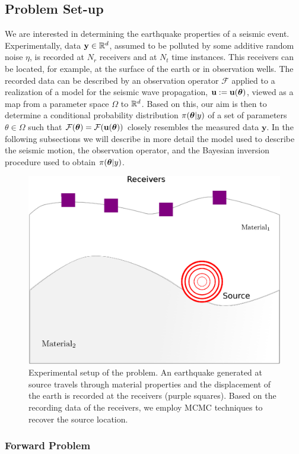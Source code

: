 \subsection{Problem Set-up}
We are interested in determining  the earthquake properties of a seismic event. Experimentally,  data  $\mathbf{y}\in \mathbb{R}^d$, assumed to be  polluted by some additive random noise $\eta$, is recorded at $N_r$ receivers and at $N_t$ time instances. This receivers can be located, for example, at the surface of the earth or in observation wells.  The recorded data can be described by an observation operator $\mathcal{F}$  applied to a realization of a model for the seismic wave propagation, $\mathbf{u}:=\mathbf{u}(\bm{\theta})$, viewed as a map from a parameter space $\Omega$ to $\mathbb{R}^d$. Based on this, our aim is then to  determine a conditional probability distribution $\pi(\bm{\theta}|y)$  of a set of parameters $\theta\in \Omega$ such that  $\mathcal{F}(\bm{\theta})=\mathcal{F}(\mathbf{u}(\bm{\theta}))$ closely resembles the measured data $\bm{y}$.  In the following subsections we will describe in more detail the model used to describe the seismic motion, the observation operator, and the Bayesian inversion procedure used to obtain $\pi(\bm{\theta}|y)$.
\begin{figure}
	\centering
	\includegraphics[width=0.5\linewidth]{setup}
	\caption{Experimental setup of the problem. An earthquake generated at source travels through material properties and the displacement of the earth is recorded at the receivers (purple squares). Based on the recording data of the receivers, we employ MCMC techniques to recover the source location. }
	\label{fig:setup}
\end{figure}

\subsubsection{Forward Problem}

